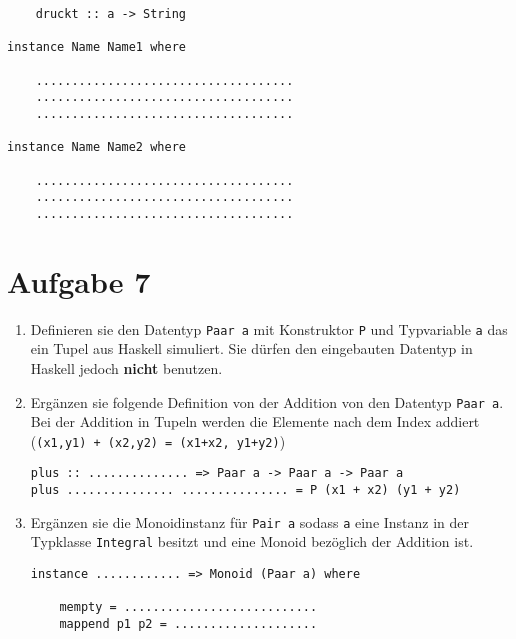\documentclass{article}
\begin{document}
\begin{enumerate} [label={\alph*)}]
\begin{verbatim}
    druckt :: a -> String

instance Name Name1 where

    ....................................
    ....................................
    ....................................

instance Name Name2 where

    ....................................
    ....................................
    ....................................
\end{verbatim}

\end{enumerate}

\section*{Aufgabe 7}
\begin{enumerate} [label={\alph*)}]

    \item Definieren sie den Datentyp \texttt{Paar a} mit Konstruktor \texttt{P} und Typvariable \texttt{a} das ein Tupel aus Haskell simuliert. Sie dürfen den eingebauten Datentyp in Haskell jedoch \textbf{nicht} benutzen.

    \item Ergänzen sie folgende Definition von der Addition von den Datentyp \texttt{Paar a}. Bei der Addition in Tupeln werden die Elemente nach dem Index addiert (\texttt{(x1,y1) + (x2,y2) = (x1+x2, y1+y2)})

\begin{verbatim}
plus :: .............. => Paar a -> Paar a -> Paar a
plus ............... ............... = P (x1 + x2) (y1 + y2)
\end{verbatim}

    \item Ergänzen sie die Monoidinstanz für \texttt{Pair a} sodass \texttt{a} eine Instanz in der Typklasse \texttt{Integral} besitzt und eine Monoid bezöglich der Addition ist.

\begin{verbatim}
instance ............ => Monoid (Paar a) where
    
    mempty = ...........................
    mappend p1 p2 = ....................
\end{verbatim}

\end{enumerate}

\newpage
\end{document}

